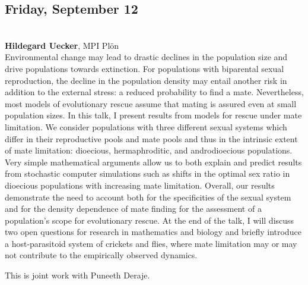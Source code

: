 \documentclass[12pt,a4paper]{article}
\begin{document}
\subsection*{\sffamily Friday, September 12}
\bigskip\bigskip
{}\\[1ex]{ \large \textbf{ Hildegard Uecker}}, MPI Plön \\[2ex] Environmental change may lead to drastic declines in the population size and drive populations towards extinction. For populations with biparental sexual reproduction, the decline in the population density may entail another risk in addition to the external stress: a reduced probability to find a mate. Nevertheless, most models of evolutionary rescue assume that mating is assured even at small population sizes. In this talk, I present results from models for rescue under mate limitation. We consider populations with three different sexual systems which differ in their reproductive pools and mate pools and thus in the intrinsic extent of mate limitation: dioecious, hermaphroditic, and androdioecious populations. Very simple mathematical arguments allow us to both explain and predict results from stochastic computer simulations such as shifts in the optimal sex ratio in dioecious populations with increasing mate limitation. Overall, our results demonstrate the need to account both for the specificities of the sexual system and for the density dependence of mate finding for the assessment of a population's scope for evolutionary rescue. At the end of the talk, I will discuss two open questions for research in mathematics and biology and briefly introduce a host-parasitoid system of crickets and flies, where mate limitation may or may not contribute to the empirically observed dynamics. 


 This is joint work with Puneeth Deraje. 

\bigskip\bigskip
\end{document}
